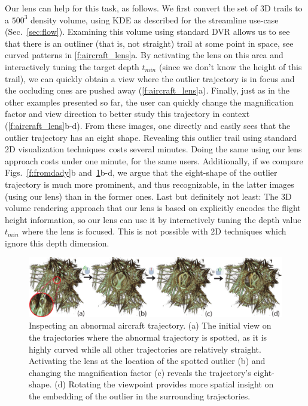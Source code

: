 Our lens can help for this task, as follows. We first convert the set of 3D trails to a $500^3$ density volume, using KDE as described for the streamline use-case (Sec.~\ref{sec:flow}). Examining this volume using standard DVR allows us to see that there is an outliner (that is, not straight) trail at some point in space, see curved patterns in \autoref{f:aircraft_lens}a. By activating the lens on this area and interactively tuning the target depth $t_{min}$ (since we don't know the height of this trail), we can quickly obtain a view where the outlier trajectory is in focus and the occluding ones are pushed away (\autoref{f:aircraft_lens}a). Finally, just as in the other examples presented so far, the user can quickly change the magnification factor and view direction to better study this trajectory in context (\autoref{f:aircraft_lens}b-d). From these images, one directly and easily sees that the outlier trajectory has an eight shape. Revealing this outlier trail using standard 2D visualization techniques\,\cite{hurter2009fromdady} costs several minutes. Doing the same using our lens approach costs under one minute, for the same users. Additionally, if we compare Figs.~\ref{f:fromdady}b and~\ref{f:aircraft_lens}b-d, we argue that the eight-shape of the outlier trajectory is much more prominent, and thus recognizable, in the latter images (using our lens) than in the former ones. Last but definitely not least: The 3D volume rendering approach that our lens is based on explicitly encodes the flight height information, so our lens can use it by interactively tuning the depth value $t_{min}$ where the lens is focused. This is not possible with 2D techniques which ignore this depth dimension.


\begin{figure}[htbp]
\includegraphics [width=\textwidth]{images/aircraft_lens.pdf}
\caption{Inspecting an abnormal aircraft trajectory. (a) The initial view on the trajectories where the abnormal trajectory is spotted, as it is highly curved while all other trajectories are relatively straight. Activating the lens at the location of the spotted outlier (b) and changing the magnification factor (c) reveals the trajectory's eight-shape. (d) Rotating the viewpoint provides more spatial insight on the embedding of the outlier in the surrounding trajectories.}
\label{f:aircraft_lens}
\end{figure}
%

